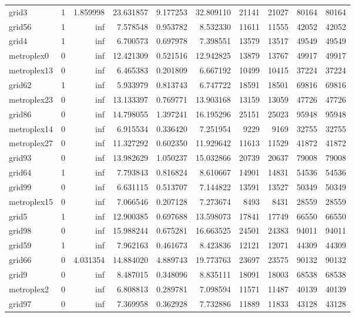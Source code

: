 \begin{longtable}{|l|r|r|r|r|r|r|r|r|r|}
grid3 & 1 & 1.859998 & 23.631857 & 9.177253 & 32.809110 & 21141 & 21027 & 80164 & 80164 \\
grid56 & 1 & inf & 7.578548 & 0.953782 & 8.532330 & 11611 & 11555 & 42052 & 42052 \\
grid4 & 1 & inf & 6.700573 & 0.697978 & 7.398551 & 13579 & 13517 & 49549 & 49549 \\
metroplex0 & 0 & inf & 12.421309 & 0.521516 & 12.942825 & 13879 & 13767 & 49917 & 49917 \\
metroplex13 & 0 & inf & 6.465383 & 0.201809 & 6.667192 & 10499 & 10415 & 37224 & 37224 \\
grid62 & 1 & inf & 5.933979 & 0.813743 & 6.747722 & 18591 & 18501 & 69816 & 69816 \\
metroplex23 & 0 & inf & 13.133397 & 0.769771 & 13.903168 & 13159 & 13059 & 47726 & 47726 \\
grid86 & 0 & inf & 14.798055 & 1.397241 & 16.195296 & 25151 & 25023 & 95948 & 95948 \\
metroplex14 & 0 & inf & 6.915534 & 0.336420 & 7.251954 & 9229 & 9169 & 32755 & 32755 \\
metroplex27 & 0 & inf & 11.327292 & 0.602350 & 11.929642 & 11613 & 11529 & 41872 & 41872 \\
grid93 & 0 & inf & 13.982629 & 1.050237 & 15.032866 & 20739 & 20637 & 79008 & 79008 \\
grid64 & 1 & inf & 7.793843 & 0.816824 & 8.610667 & 14901 & 14831 & 54536 & 54536 \\
grid99 & 0 & inf & 6.631115 & 0.513707 & 7.144822 & 13591 & 13527 & 50349 & 50349 \\
metroplex15 & 0 & inf & 7.066546 & 0.207128 & 7.273674 & 8493 & 8431 & 28559 & 28559 \\
grid5 & 1 & inf & 12.900385 & 0.697688 & 13.598073 & 17841 & 17749 & 66550 & 66550 \\
grid98 & 0 & inf & 15.988244 & 0.675281 & 16.663525 & 24501 & 24383 & 94011 & 94011 \\
grid59 & 1 & inf & 7.962163 & 0.461673 & 8.423836 & 12121 & 12071 & 44309 & 44309 \\
grid66 & 0 & 4.031354 & 14.884020 & 4.889743 & 19.773763 & 23697 & 23575 & 90132 & 90132 \\
grid9 & 0 & inf & 8.487015 & 0.348096 & 8.835111 & 18091 & 18003 & 68538 & 68538 \\
metroplex2 & 0 & inf & 6.808813 & 0.289781 & 7.098594 & 11571 & 11487 & 40139 & 40139 \\
grid97 & 0 & inf & 7.369958 & 0.362928 & 7.732886 & 11889 & 11833 & 43128 & 43128 \\

\end{longtable}
